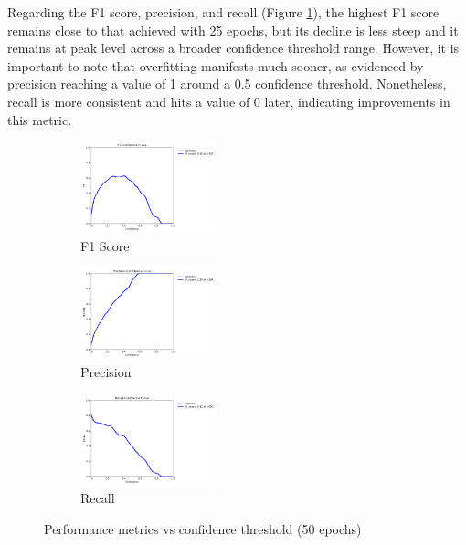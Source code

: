 \documentclass[runningheads]{llncs}
\begin{document}
Regarding the F1 score, precision, and recall (Figure \ref{fig12}), the highest F1 score remains close to that achieved with 25 epochs, but its decline is less steep and it remains at peak level across a broader confidence threshold range. However, it is important to note that overfitting manifests much sooner, as evidenced by precision reaching a value of 1 around a 0.5 confidence threshold. Nonetheless, recall is more consistent and hits a value of 0 later, indicating improvements in this metric.

\begin{figure}[H]
    
    \begin{subfigure}[b]{0.25\textwidth}
        \begin{center}
        \includegraphics[height = 100px]{./figures/fig12a_50e_f1_curve.png}
        \caption{F1 Score}
        \end{center}
    \end{subfigure}
    \hfill
    \begin{subfigure}[b]{0.25\textwidth}
    \begin{center}
        \includegraphics[height = 100px]{./figures/fig12b_50e_P_curve.png}
        \caption{Precision}
        \end{center}
    \end{subfigure}
    \hfill
    \begin{subfigure}[b]{0.25\textwidth}
    \begin{center}
        \includegraphics[height = 100px]{./figures/fig12c_50e_R_curve.png}
        \caption{Recall}
        \end{center}
    \end{subfigure}
    \caption{Performance metrics vs confidence threshold (50 epochs)}
    \label{fig12}
\end{figure}
\end{document}
